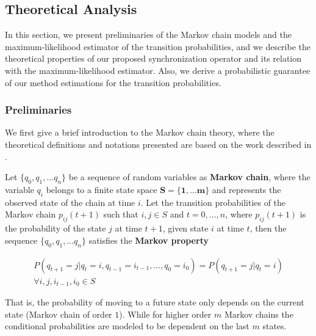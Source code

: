 \subsection{Theoretical Analysis}
\label{sec:theoretical}

 In this section, we present preliminaries of the Markov chain models and the maximum-likelihood estimator of the transition probabilities, and we describe the theoretical properties of our proposed synchronization operator and its relation with the maximum-likelihood estimator. Also, we derive a probabilistic guarantee of our method estimations for the transition probabilities. 
 
 
 \subsubsection*{Preliminaries}
 We first give a brief introduction to the Markov chain theory, where the theoretical definitions and notations presented are based on the work described in \cite{bertsekas2002introduction,Billingsley1961,anderson1957statistical,howard2012dynamic}.

\begin{definition}
	Let $\{q_0, q_1, \ldots q_n\}$ be a sequence of random variables as \textbf{Markov chain}, where the variable $q_i$ belongs to a finite state space $\mathbf{S =\{1,\ldots m\}}$ and represents the observed state of the chain at time $i$. Let the transition probabilities of the Markov chain $p_{ij}(t+1)$ such that $i,j \in S$ and $t=0,\ldots, n$, where  $p_{ij}(t+1)$ is the probability of the state $j$ at time $t+1$, given  state $i$ at time $t$, then the sequence $\{q_0, q_1, \ldots q_n\}$ satisfies the \textbf{Markov property} 
	
	\begin{equation}
	\begin{aligned}
	P(q_{t+1}=j|q_{t}=i,q_{t-1}=i_{t-1},\ldots ,q_{0}=i_{0})=P(q_{t+1}=j|q_{t}=i)\\
	\forall i,j,i_{t-1},i_{0} \in S
	\end{aligned}
	\end{equation}

\end{definition}



\par That is, the probability of moving to a future state only depends on the current state (Markov chain of order $1$). While for higher order $m$ Markov chains the conditional probabilities are modeled to be dependent on the last $m$ states. 

